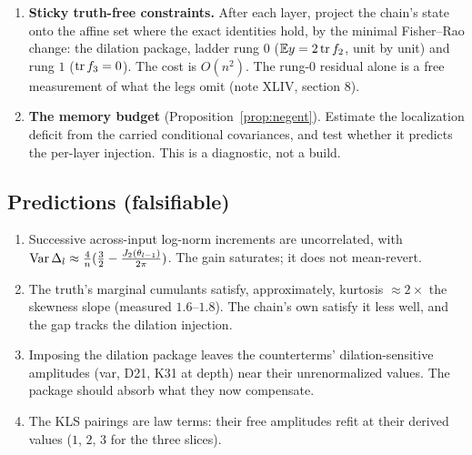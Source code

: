 \begin{enumerate}[leftmargin=*]
\begin{itemize}
\end{itemize}
\item \textbf{Sticky truth-free constraints.} After each layer, project the chain's state onto the affine set where the exact identities
hold, by the minimal Fisher--Rao change: the dilation package, ladder rung $0$ ($\mathbb E y=2\operatorname{tr} f_2$, unit by unit) and rung $1$ ($\operatorname{tr} f_3=0$).
The cost is $O(n^2)$. The rung-$0$ residual alone is a free measurement of what the legs omit (note XLIV, section 8).
\item \textbf{The memory budget} (Proposition~\ref{prop:negent}). Estimate the localization deficit from the carried conditional covariances,
and test whether it predicts the per-layer injection. This is a diagnostic, not a build.
\end{enumerate}

\subsection{Predictions (falsifiable)}
\begin{enumerate}[leftmargin=*]
\item Successive across-input log-norm increments are uncorrelated, with $\operatorname{Var}\Delta_l\approx\frac4n(\frac32-\frac{J_2(\theta_{l-1})}{2\pi})$. The gain
saturates; it does not mean-revert.
\item The truth's marginal cumulants satisfy, approximately, kurtosis $\approx2\times$ the skewness slope (measured $1.6$--$1.8$). The chain's
own satisfy it less well, and the gap tracks the dilation injection.
\item Imposing the dilation package leaves the counterterms' dilation-sensitive amplitudes (var, D21, K31 at depth) near their
unrenormalized values. The package should absorb what they now compensate.
\item The KLS pairings are law terms: their free amplitudes refit at their derived values ($1$, $2$, $3$ for the three slices).
\end{enumerate}

